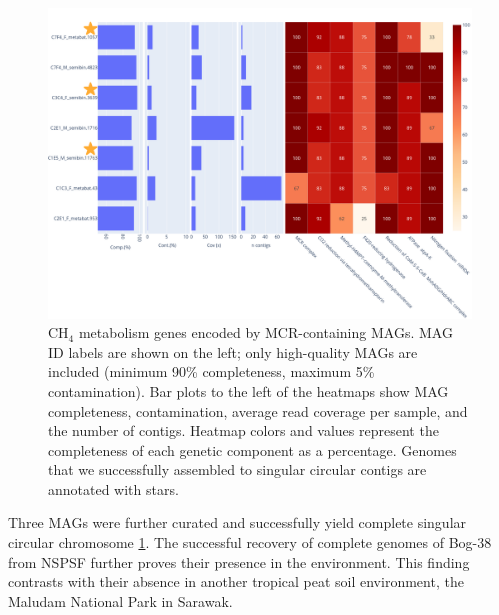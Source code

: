 \begin{multicols}{2}[\columnsep=0.4cm]
    \begin{figure}[H]
        \vspace{-0.4cm}
        \centering
        \includegraphics[width=\linewidth]{content-images/heatmap.png}
        \caption{\scriptsize CH$_4$ metabolism genes encoded by MCR-containing MAGs. MAG ID labels are shown on the left; only high-quality MAGs are included (minimum 90\% completeness, maximum 5\% contamination). Bar plots to the left of the heatmaps show MAG completeness, contamination, average read coverage per sample, and the number of contigs. Heatmap colors and values represent the completeness of each genetic component as a percentage. Genomes that we successfully assembled to singular circular contigs are annotated with stars.}
        \label{fig:heatmap}
    \end{figure}

    \vspace{-0.4cm}
    Three MAGs were further curated and successfully yield complete singular circular chromosome \ref{fig:heatmap}. The successful recovery of complete genomes of Bog-38 from NSPSF further proves their presence in the environment. This finding contrasts with their absence in another tropical peat soil environment, the Maludam National Park in Sarawak. 
    

\end{multicols}



